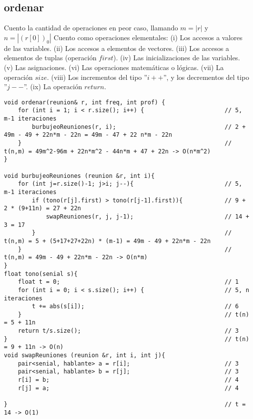 \documentclass{article}
\begin{document}
\newpage
\subsection{ordenar}
Cuento la cantidad de operaciones en peor caso, llamando $m=|r|$ y $n=|(r[0])_0|$
Cuento como operaciones elementales: \newline
(i) Los accesos a valores de las variables. \newline
(ii) Los accesos a elementos de vectores. \newline
(iii) Los accesos a elementos de tuplas (operación $first$). \newline
(iv) Las inicializaciones de las variables. \newline
(v) Las asignaciones. \newline
(vi) Las operaciones matemáticas o lógicas. \newline
(vii) La operación $size$. \newline
(viii) Los incrementos del tipo ”$i++$”, y los decrementos del tipo ”$j−−$”. \newline
(ix) La operación $return$. \newline

\begin{lstlisting}
void ordenar(reunion& r, int freq, int prof) {
    for (int i = 1; i < r.size(); i++) {                       // 5, m-1 iteraciones
        burbujeoReuniones(r, i);                               // 2 + 49m - 49 + 22n*m - 22n = 49m - 47 + 22 n*m - 22n
    }                                                          // t(n,m) = 49m^2-96m + 22n*m^2 - 44n*m + 47 + 22n -> O(n*m^2)
}

void burbujeoReuniones (reunion &r, int i){
    for (int j=r.size()-1; j>i; j--){                          // 5, m-1 iteraciones
        if (tono(r[j].first) > tono(r[j-1].first)){            // 9 + 2 * (9+11n) = 27 + 22n
            swapReuniones(r, j, j-1);                          // 14 + 3 = 17
        }                                                      // t(n,m) = 5 + (5+17+27+22n) * (m-1) = 49m - 49 + 22n*m - 22n
    }                                                          // t(n,m) = 49m - 49 + 22n*m - 22n -> O(n*m)
}
float tono(senial s){
    float t = 0;                                               // 1
    for (int i = 0; i < s.size(); i++) {                       // 5, n iteraciones
        t += abs(s[i]);                                        // 6
    }                                                          // t(n) = 5 + 11n
    return t/s.size();                                         // 3
}                                                              // t(n) = 9 + 11n -> O(n)
void swapReuniones (reunion &r, int i, int j){
    pair<senial, hablante> a = r[i];                           // 3
    pair<senial, hablante> b = r[j];                           // 3
    r[i] = b;                                                  // 4
    r[j] = a;                                                  // 4

}                                                              // t = 14 -> O(1)
\end{lstlisting}
\end{document}
